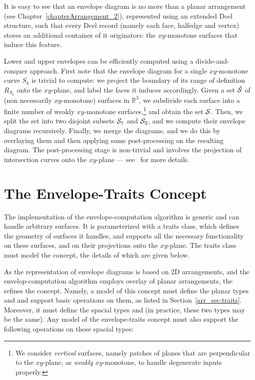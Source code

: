 It is easy to see that an envelope diagram is no more than a planar
arrangement (see Chapter~\ref{chapterArrangement_2}), represented
using an extended {\sc Dcel} structure, such that every {\sc Dcel}
record (namely each face, halfedge and vertex) stores an additional
container of it originators: the $xy$-monotone surfaces that induce
this feature.

Lower and upper envelopes can be efficiently computed using a
divide-and-conquer approach. First note that the envelope diagram for
a single $xy$-monotone curve $S_k$ is trivial to compute: we project
the boundary of its range of definition $R_{S_k}$ onto the $xy$-plane,
and label the faces it induces accordingly. Given a set $\hat{{\cal S}}$
of (non necessarily $xy$-monotone) surfaces in ${\mathbb R}^3$, we subdivide
each surface into a finite number of weakly $xy$-monotone 
surfaces,\footnote{We consider {\em vertical} surfaces, namely patches 
of planes that are perpendicular to the $xy$-plane, as {\em weakly} 
$xy$-monotone, to handle degenerate inputs properly.} and obtain the 
set ${\cal S}$. Then, we split the set into two disjoint subsets ${\cal S}_1$
and ${\cal S}_2$, and we compute their envelope diagrams recursively.
Finally, we merge the diagrams, and we do this by overlaying them and 
then applying some post-processing on the resulting diagram. The 
post-processing stage is non-trivial and involves the projection of 
intersection curves onto the $xy$-plane --- see~\cite{cgal:m-rgece-06}
for more details.

\section{The Envelope-Traits Concept}

The implementation of the envelope-computation algorithm is generic and
can handle arbitrary surfaces. It is parameterized with a traits class,
which defines the geometry of surfaces it handles, and supports all
the necessary functionality on these surfaces, and on their projections 
onto the $xy$-plane. The traits class must model the 
 concept, the details of which are given below.

As the representation of envelope diagrams is based on 2D
arrangements, and the envelop-computation algorithm employs overlay
of planar arrangements, the  refines the
 concept. Namely, a model of this 
concept must define the planar types  and 
 and support basic operations on them, as 
listed in Section~\ref{arr_sec:traits}. Moreover, it must define the 
spacial types  and  (in practice,
these two types may be the same). Any model of the envelope-traits
concept must also support the following operations on these spacial
types:


